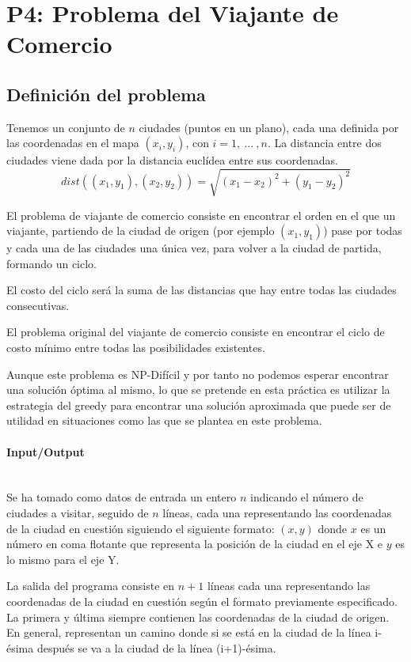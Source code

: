 \documentclass{article}
\newcommand{\myparagraph}[1]{\paragraph{#1}\mbox{}\\}
\begin{document}
\newpage
\section{P4: Problema del Viajante de Comercio}
\subsection{Definición del problema}
Tenemos un conjunto de $n$ ciudades (puntos en un plano),
cada una definida por las coordenadas en el mapa $(x_i, y_i)$,
con $i = 1,\ ...\ , n$. La distancia entre dos ciudades viene
dada por la distancia euclídea entre sus coordenadas.
\[
dist((x_1, y_1),(x_2, y_2)) = \sqrt{(x_1 - x_2)^2 + (y_1 - y_2)^2}
\]

El problema de viajante de comercio consiste en encontrar el
orden en el que un viajante, partiendo de la ciudad de origen
(por ejemplo $(x_1, y_1)$) pase por todas y cada una de las ciudades
una única vez, para volver a la ciudad de partida, formando un ciclo.

El costo del ciclo será la suma de las distancias que hay entre todas las ciudades consecutivas.

El problema original del viajante de comercio consiste en encontrar el ciclo de costo mínimo entre todas las posibilidades existentes.

Aunque este problema es NP-Difícil y por tanto no podemos esperar
encontrar una solución óptima al mismo, lo que se pretende en esta
práctica es utilizar la estrategia del greedy
para encontrar una solución aproximada que puede ser de utilidad en
situaciones como las que se plantea en este problema.

\myparagraph{Input/Output}

Se ha tomado como datos de entrada un entero $n$ indicando el número de ciudades a visitar, seguido de $n$ líneas, cada
una representando las coordenadas de la ciudad en cuestión
siguiendo el siguiente formato: $(x,y)$ donde $x$ es un 
número en coma flotante que representa la posición de la ciudad
en el eje X e $y$ es lo mismo para el eje Y.

La salida del programa consiste en $n+1$ líneas cada una 
representando las coordenadas de la ciudad en cuestión según el
formato previamente especificado. La primera y última
siempre contienen las coordenadas de la ciudad de origen.
En general, representan un camino donde si se está en la 
ciudad de la línea i-ésima después se va a la ciudad de 
la línea (i+1)-ésima.

\begin{ejemplo}
    
\end{ejemplo}
\end{document}
